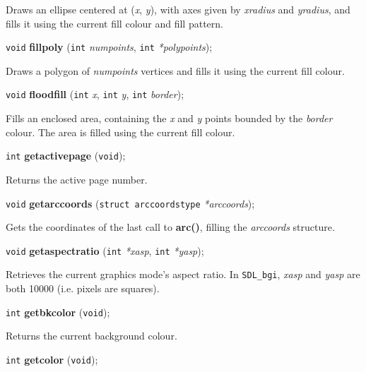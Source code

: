 \documentclass[a4paper,11pt]{article}
\newcommand{\SDLbgi}{\texttt{SDL\_bgi}}
\newcommand{\V}{\texttt{void}}      %
\newcommand{\I}{\texttt{int}}       %
\newcommand{\func}[1]{\textbf{#1}}  %
\newcommand{\A}[1]{\emph{#1}}       %
\newenvironment{bgi}
{ %
  \begin{snugshade}
}
{ %
  \end{snugshade}
}
\begin{document}
Draws an ellipse centered at (\A{x}, \A{y}), with axes given by
\A{xradius} and \A{yradius}, and fills it using the current fill
colour and fill pattern.


\begin{bgi}
\V{} \func{fillpoly} (\I{} \A{numpoints}, \I{} \A{*polypoints});
\end{bgi}

Draws a polygon of \A{numpoints} vertices and fills it using the
current fill colour.


\begin{bgi}
\V{} \func{floodfill} (\I{} \A{x}, \I{} \A{y}, \I{} \A{border});
\end{bgi}

Fills an enclosed area, containing the \A{x} and \A{y} points bounded
by the \A{border} colour. The area is filled using the current fill
colour.


\begin{bgi}
\I{} \func{getactivepage} (\V{});
\end{bgi}

Returns the active page number.


\begin{bgi}
\V{} \func{getarccoords} (\texttt{struct arccoordstype} \A{*arccoords});
\end{bgi}

Gets the coordinates of the last call to \func{arc()}, filling the
\A{arccoords} structure.


\begin{bgi}
\V{} \func{getaspectratio} (\I{} \A{*xasp}, \I{} \A{*yasp});
\end{bgi}

Retrieves the current graphics mode's aspect ratio. In \SDLbgi,
\A{xasp} and \A{yasp} are both 10000 (i.e. pixels are squares).


\begin{bgi}
\I{} \func{getbkcolor} (\V{});
\end{bgi}

Returns the current background colour.


\begin{bgi}
\I{} \func{getcolor} (\V{});
\end{bgi}
\end{document}
